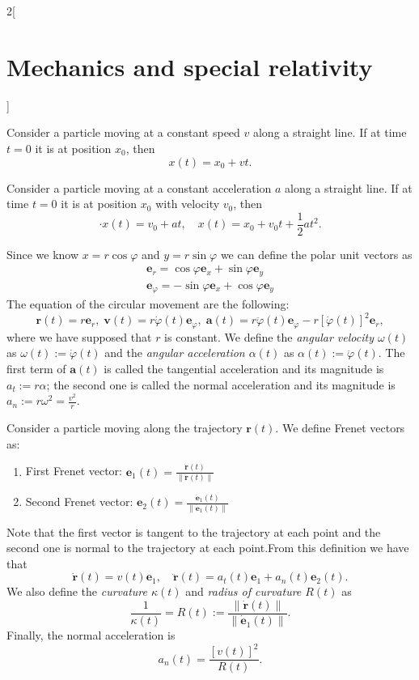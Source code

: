 \documentclass[../../../main.tex]{subfiles}
\begin{document}
\begin{multicols}{2}[\section{Mechanics and special relativity}]
\begin{concept}
Consider a particle moving at a constant speed $v$ along a straight line. If at time $t=0$ it is at position $x_0$, then $$x(t)=x_0+vt.$$
\end{concept}
\begin{concept}
Consider a particle moving at a constant acceleration $a$ along a straight line. If at time $t=0$ it is at position $x_0$ with velocity $v_0$, then $$\cdot{x}(t)=v_0+at,\quad x(t)=x_0+v_0t+\frac{1}{2}at^2.$$
\end{concept}
\begin{concept}
Since we know $x=r\cos\varphi$ and $y=r\sin \varphi$ we can define the polar unit vectors as
\begin{gather*}
    \boldsymbol{e}_r=\cos\varphi\boldsymbol{e}_x+\sin\varphi\boldsymbol{e}_y\\
    \boldsymbol{e}_\varphi=-\sin\varphi\boldsymbol{e}_x+\cos\varphi\boldsymbol{e}_y
\end{gather*}
The equation of the circular movement are the following: $$\boldsymbol{r}(t)=r\boldsymbol{e}_r,\;\boldsymbol{v}(t)=r\dot{\varphi}(t)\boldsymbol{e}_\varphi,\;\boldsymbol{a}(t)=r\ddot{\varphi}(t)\boldsymbol{e}_\varphi-r\left[\dot{\varphi}(t)\right]^2\boldsymbol{e}_r,$$ where we have supposed that $r$ is constant. We define the \textit{angular velocity $\omega(t)$} as $\omega(t):=\dot{\varphi}(t)$ and the \textit{angular acceleration $\alpha(t)$} as $\alpha(t):=\ddot{\varphi}(t)$. The first term of $\boldsymbol{a}(t)$ is called the tangential acceleration and its magnitude is $a_t:=r\alpha$; the second one is called the normal acceleration and its magnitude is $a_n:=r\omega^2=\frac{v^2}{r}$.
\end{concept}
\begin{concept}
Consider a particle moving along the trajectory $\boldsymbol{r}(t)$. We define Frenet vectors as:
\begin{enumerate}
    \item First Frenet vector: $\displaystyle\boldsymbol{e}_1(t)=\frac{\dot{\boldsymbol{r}}(t)}{\|\dot{\boldsymbol{r}}(t)\|}$
    \item Second Frenet vector: $\displaystyle\boldsymbol{e}_2(t)=\frac{\dot{\boldsymbol{e}}_1(t)}{\|\dot{\boldsymbol{e}}_1(t)\|}$
\end{enumerate}
Note that the first vector is tangent to the trajectory at each point and the second one is normal to the trajectory at each point.\newline From this definition we have that $$\dot{\boldsymbol{r}}(t)=v(t)\boldsymbol{e}_1,\quad\ddot{\boldsymbol{r}}(t)=a_t(t)\boldsymbol{e}_1+a_n(t)\boldsymbol{e}_2(t).$$ We also define the \textit{curvature $\kappa(t)$} and \textit{radius of curvature $R(t)$} as $$\frac{1}{\kappa(t)}=R(t):=\frac{\|\dot{\boldsymbol{r}}(t)\|}{\|\dot{\boldsymbol{e}}_1(t)\|}.$$ Finally, the normal acceleration is $$a_n(t)=\frac{\left[v(t)\right]^2}{R(t)}.$$

\end{concept}
\end{multicols}
\end{document}
